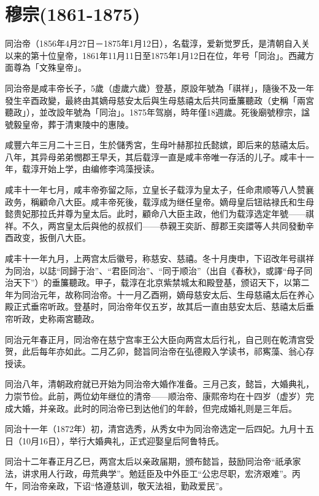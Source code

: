 
\section{穆宗\tiny(1861-1875)}

同治帝（1856年4月27日－1875年1月12日），名载淳，爱新觉罗氏，是清朝自入关以来的第十位皇帝，1861年11月11日至1875年1月12日在位，年号「同治」。西藏方面尊為「文殊皇帝」。

同治帝是咸丰帝长子，5歲（虛歲六歲）登基，原設年號為「祺祥」，隨後不及一年發生辛酉政變，最終由其嫡母慈安太后與生母慈禧太后共同垂簾聽政（史稱「兩宮聽政」），並改設年號為「同治」。1875年驾崩，時年僅18週歲。死後廟號穆宗，諡號毅皇帝，葬于清東陵中的惠陵。

咸豐六年三月二十三日，生於儲秀宮，生母叶赫那拉氏懿嫔，即后来的慈禧太后。八年，其异母弟弟憫郡王早夭，其后载淳一直是咸丰帝唯一存活的儿子。咸丰十一年，载淳开始上学，由编修李鸿藻授读。

咸丰十一年七月，咸丰帝弥留之际，立皇长子载淳为皇太子，任命肃顺等八人赞襄政务，稱顧命八大臣。咸丰帝死後，载淳成为继任皇帝。嫡母皇后钮祜禄氏和生母懿贵妃那拉氏并尊为皇太后。此时，顧命八大臣主政，他们为载淳选定年號——祺祥。不久，两宫皇太后與他的叔叔们——恭親王奕訢、醇郡王奕譞等人共同發動辛酉政变，扳倒八大臣。

咸丰十一年九月，上两宫太后徽号，称慈安、慈禧。冬十月庚申，下诏改年号祺祥为同治，以誌“同歸于治”、“君臣同治”、“同于顺治”（出自《春秋》，或譯“母子同治天下”）的垂簾聽政。甲子，载淳在北京紫禁城太和殿登基，颁诏天下，以第二年为同治元年，故称同治帝。十一月乙酉朔，嫡母慈安太后、生母慈禧太后在养心殿正式垂帘听政。登基时，同治帝年仅五岁，故其后一直由慈安太后、慈禧太后垂帘听政，史称兩宮聽政。

同治元年春正月，同治帝在慈宁宫率王公大臣向两宫太后行礼，自己则在乾清宫受贺，此后每年亦如此。二月乙卯，懿旨同治帝在弘德殿入学读书，祁寯藻、翁心存授读。

同治八年，清朝政府就已开始为同治帝大婚作准备。三月己亥，懿旨，大婚典礼，力崇节俭。此前，两位幼年继位的清帝——顺治帝、康熙帝均在十四岁（虚岁）完成大婚，并亲政。此时的同治帝已到达他们的年龄，但完成婚礼则是三年后。

同治十一年（1872年）初，清宫选秀，从秀女中为同治帝选定一后四妃。九月十五日（10月16日），举行大婚典礼，正式迎娶皇后阿鲁特氏。

同治十二年春正月乙巳，两宫太后以亲政届期，颁布懿旨，鼓励同治帝“祇承家法，讲求用人行政，毋荒典学”。勉廷臣及中外臣工“公忠尽职，宏济艰难”。丙午，同治帝亲政，下诏“恪遵慈训，敬天法祖，勤政爱民”。


